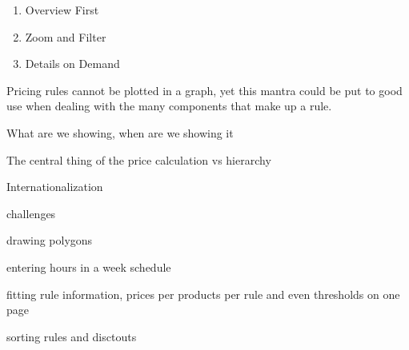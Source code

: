 \begin{enumerate}
	\item Overview First
	\item Zoom and Filter
	\item Details on Demand
\end{enumerate}

Pricing rules cannot be plotted in a graph, yet this mantra could be put to good use when dealing with the many components that make up a rule.


What are we showing, when are we showing it

The central thing of the price calculation vs hierarchy

Internationalization




challenges

drawing polygons

entering hours in a week schedule

fitting rule information, prices per products per rule and even thresholds on one page

sorting rules and disctouts